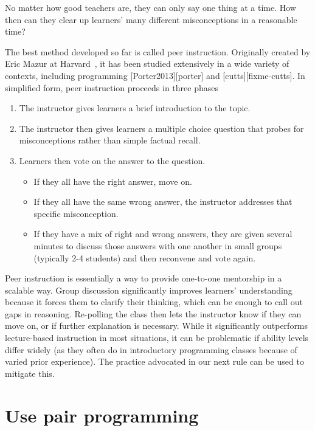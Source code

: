 \documentclass{article}
\begin{document}
No matter how good teachers are,
they can only say one thing at a time.
How then can they clear up learners' many different misconceptions
in a reasonable time?

The best method developed so far is called peer instruction.
Originally created by Eric Mazur at Harvard~\citep{mazur-peer-instruction},
it has been studied extensively in a wide variety of contexts,
including programming [Porter2013][porter] and [cutts][fixme-cutts].
In simplified form,
peer instruction proceeds in three phases

\begin{enumerate}
\item The instructor gives learners a brief introduction to the topic.
\item The instructor then gives learners a multiple choice question
   that probes for misconceptions rather than simple factual recall.
\item Learners then vote on the answer to the question.
  \begin{itemize}
   \item If they all have the right answer, move on.
   \item If they all have the same wrong answer,
     the instructor addresses that specific misconception.
   \item If they have a mix of right and wrong answers,
     they are given several minutes to discuss those answers with one another
     in small groups (typically 2-4 students)
     and then reconvene and vote again.
\end{itemize}
\end{enumerate}

Peer instruction is essentially
a way to provide one-to-one mentorship in a scalable way.
Group discussion significantly improves learners' understanding
because it forces them to clarify their thinking,
which can be enough to call out gaps in reasoning.
Re-polling the class then lets the instructor know if they can move on,
or if further explanation is necessary.
While it significantly outperforms lecture-based instruction in most situations,
it can be problematic if ability levels differ widely
(as they often do in introductory programming classes
because of varied prior experience).
The practice advocated in our next rule can be used to mitigate this.

\section{Use pair programming}
\end{document}
